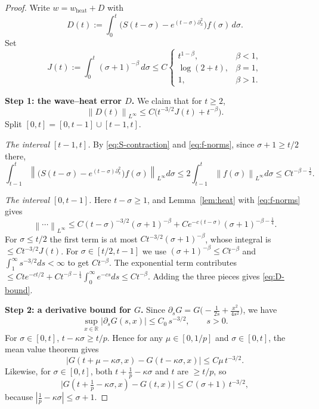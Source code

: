 \documentclass[11pt]{amsart}
\theoremstyle{definition}
\theoremstyle{remark}
\numberwithin{equation}{section}
\newcommand{\R}{{\mathbb R}}
\newcommand{\pt}{\partial}
\newcommand{\norm}[1]{\left\lVert #1\right\rVert}
\begin{document}
\begin{proof}
Write $w=w_{\mathrm{heat}}+D$ with
\[
D(t):=\int_0^t\bigl(S(t-\sigma)-e^{(t-\sigma)\pt_x^2}\bigr)f(\sigma)\,d\sigma .
\]
Set
\begin{equation}\label{eq:def-J}
J(t):=\int_0^t(\sigma+1)^{-\beta}\,d\sigma\le C\begin{cases}t^{1-\beta},&\beta<1,\\ \log(2+t),&\beta=1,\\ 1,&\beta>1.\end{cases}
\end{equation}

\medskip
\noindent\textbf{Step 1: the wave--heat error $D$.}
We claim that for $t\ge2$,
\begin{equation}\label{eq:D-bound}
\norm{D(t)}_{L^\infty}\le C\bigl(t^{-3/2}J(t)+t^{-\beta}\bigr).
\end{equation}
Split $[0,t]=[0,t-1]\cup[t-1,t]$.

\emph{The interval $[t-1,t]$.} By \eqref{eq:S-contraction} and \eqref{eq:f-norms}, since $\sigma+1\ge t/2$ there,
\[
\int_{t-1}^t\norm{\bigl(S(t-\sigma)-e^{(t-\sigma)\pt_x^2}\bigr)f(\sigma)}_{L^\infty}d\sigma
\le2\int_{t-1}^t\norm{f(\sigma)}_{L^\infty}d\sigma\le Ct^{-\beta-\frac12}.
\]

\emph{The interval $[0,t-1]$.} Here $t-\sigma\ge1$, and Lemma~\ref{lem:heat} with \eqref{eq:f-norms} gives
\[
\norm{\cdots}_{L^\infty}\le C(t-\sigma)^{-3/2}(\sigma+1)^{-\beta}+Ce^{-c(t-\sigma)}(\sigma+1)^{-\beta-\frac14}.
\]
For $\sigma\le t/2$ the first term is at most $C t^{-3/2}(\sigma+1)^{-\beta}$, whose integral is $\le Ct^{-3/2}J(t)$.
For $\sigma\in[t/2,t-1]$ we use $(\sigma+1)^{-\beta}\le Ct^{-\beta}$ and $\int_1^\infty s^{-3/2}ds<\infty$ to get $Ct^{-\beta}$.
The exponential term contributes $\le Cte^{-ct/2}+Ct^{-\beta-\frac14}\int_0^\infty e^{-cs}ds\le Ct^{-\beta}$.
Adding the three pieces gives \eqref{eq:D-bound}.

\medskip
\noindent\textbf{Step 2: a derivative bound for $G$.}
Since $\pt_sG=G\bigl(-\frac1{2s}+\frac{x^2}{4s^2}\bigr)$, we have
\begin{equation}\label{eq:dsG}
\sup_{x\in\R}|\pt_sG(s,x)|\le C_0\,s^{-3/2},\qquad s>0 .
\end{equation}
For $\sigma\in[0,t]$, $t-\kappa\sigma\ge t/p$. Hence for any $\mu\in[0,1/p]$ and $\sigma\in[0,t]$, the mean value theorem gives
\begin{equation}\label{eq:MVT}
\bigl|G(t+\mu-\kappa\sigma,x)-G(t-\kappa\sigma,x)\bigr|\le C\mu\,t^{-3/2}.
\end{equation}
Likewise, for $\sigma\in[0,t]$, both $t+\frac1p-\kappa\sigma$ and $t$ are $\ge t/p$, so
\begin{equation}\label{eq:MVT2}
\bigl|G(t+\tfrac1p-\kappa\sigma,x)-G(t,x)\bigr|\le C\,(\sigma+1)\,t^{-3/2},
\end{equation}
because $|\frac1p-\kappa\sigma|\le\sigma+1$.


\end{proof}
\end{document}

